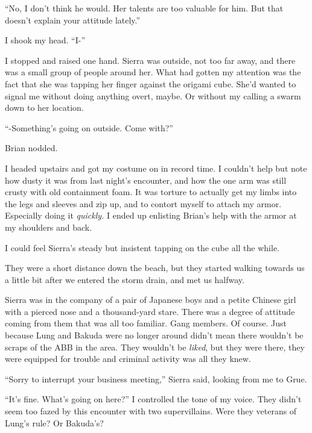 ``No, I don't think he would.  Her talents are too valuable for him.  But that doesn't explain your attitude lately.''



I shook my head.  ``I-''



I stopped and raised one hand.  Sierra was outside, not too far away, and there was a small group of people around her.  What had gotten my attention was the fact that she was tapping her finger against the origami cube.  She'd wanted to signal me without doing anything overt, maybe.  Or without my calling a swarm down to her location.



``-Something's going on outside.  Come with?''



Brian nodded.



I headed upstairs and got my costume on in record time.  I couldn't help but note how dusty it was from last night's encounter, and how the one arm was still crusty with old containment foam.  It was torture to actually get my limbs into the legs and sleeves and zip up, and to contort myself to attach my armor.  Especially doing it \emph{quickly.  }I ended up enlisting Brian's help with the armor at my shoulders and back.



I could feel Sierra's steady but insistent tapping on the cube all the while.



They were a short distance down the beach, but they started walking towards us a little bit after we entered the storm drain, and met us halfway.



Sierra was in the company of a pair of Japanese boys and a petite Chinese girl with a pierced nose and a thousand-yard stare.  There was a degree of attitude coming from them that was all too familiar.  Gang members.  Of course.  Just because Lung and Bakuda were no longer around didn't mean there wouldn't be scraps of the ABB in the area.  They wouldn't be \emph{liked}, but they were there, they were equipped for trouble and criminal activity was all they knew.



``Sorry to interrupt your business meeting,'' Sierra said, looking from me to Grue.



``It's fine.  What's going on here?''  I controlled the tone of my voice.  They didn't seem too fazed by this encounter with two supervillains.  Were they veterans of Lung's rule?  Or Bakuda's?



